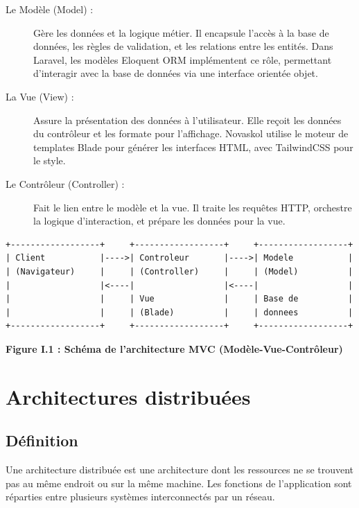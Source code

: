 \documentclass[12pt,a4paper,twoside]{report}
\begin{document}
\begin{description}
    \item[Le Modèle (Model) :] Gère les données et la logique métier. Il encapsule l'accès à la base de données, les règles de validation, et les relations entre les entités. Dans Laravel, les modèles Eloquent ORM implémentent ce rôle, permettant d'interagir avec la base de données via une interface orientée objet.
    \item[La Vue (View) :] Assure la présentation des données à l'utilisateur. Elle reçoit les données du contrôleur et les formate pour l'affichage. Novaskol utilise le moteur de templates Blade pour générer les interfaces HTML, avec TailwindCSS pour le style.
    \item[Le Contrôleur (Controller) :] Fait le lien entre le modèle et la vue. Il traite les requêtes HTTP, orchestre la logique d'interaction, et prépare les données pour la vue.
\end{description}

\begin{verbatim}
+------------------+     +------------------+     +------------------+
| Client           |---->| Controleur       |---->| Modele           |
| (Navigateur)     |     | (Controller)     |     | (Model)          |
|                  |<----|                  |<----|                  |
|                  |     | Vue              |     | Base de          |
|                  |     | (Blade)          |     | donnees          |
+------------------+     +------------------+     +------------------+
\end{verbatim}

\begin{center}
\textbf{Figure I.1 : Schéma de l'architecture MVC (Modèle-Vue-Contrôleur)}
\end{center}

\section{Architectures distribuées}

\subsection{Définition}

Une architecture distribuée est une architecture dont les ressources ne se trouvent pas au même endroit ou sur la même machine. Les fonctions de l'application sont réparties entre plusieurs systèmes interconnectés par un réseau.
\end{document}
